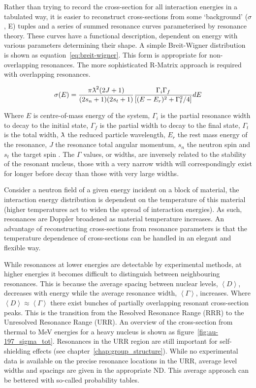 Rather than trying to record the cross-section for all interaction energies in a tabulated way, it is easier to reconstruct cross-sections from some `background' ($\sigma$, E) tuples and a series of summed resonance curves parameterised by resonance theory. These curves have a functional description, dependent on energy with various parameters determining their shape. A simple Breit-Wigner distribution is shown as equation~\ref{eq:breit-wigner}. This form is appropriate for non-overlapping resonances. The more sophisticated R-Matrix approach is required with overlapping resonances. 

\begin{equation}
  \sigma(E) =  \frac{\pi\lambdabar^{2}(2J + 1)}{(2s_{n} + 1)(2s_{t} + 1)}  \frac{\Gamma_{i}\Gamma_{f}}{[(E-E_{r})^{2} + \Gamma^{2}_{t}/4]} dE
  \label{eq:breit-wigner}
\end{equation}

Where $E$ is centre-of-mass energy of the system, $\Gamma_{i}$ is the partial resonance width to decay to the initial state, $\Gamma_{f}$ is the partial width to decay to the final state, $\Gamma_{t}$ is the total width, $\lambdabar$ the reduced particle wavelength, $E_{r}$ the rest mass energy of the resonance, $J$ the resonance total angular momentum, $s_{n}$ the neutron spin and $s_{t}$ the target spin \cite{Libby2005}. The $\Gamma$ values, or widths, are inversely related to the stability of the resonant nucleus, those with a very narrow width will correspondingly exist for longer before decay than those with very large widths.

Consider a neutron field of a given energy incident on a block of material, the interaction energy distribution is dependent on the temperature of this material (higher temperatures act to widen the spread of interaction energies). As such, resonances are Doppler broadened as material temperature increases. An advantage of reconstructing cross-sections from resonance parameters is that the temperature dependence of cross-sections can be handled in an elegant and flexible way. 

While resonances at lower energies are detectable by experimental methods, at higher energies it becomes difficult to distinguish between neighbouring resonances. This is because the average spacing between nuclear levels, $\left<D\right>$, decreases with energy while the average resonance width, $\left<\Gamma\right>$, increases. Where $\left<D\right> \approx \left<\Gamma\right>$ there exist bunches of partially overlapping resonant cross-section peaks. This is the transition from the Resolved Resonance Range (RRR) to the Unresolved Resonance Range (URR). An overview of the cross-section from thermal to MeV energies for a heavy nucleus is shown as figure~\ref{fig:au-197_sigma_tot}. Resonances in the URR region are still important for self-shielding effects (see chapter~\ref{chap:group_structure}). While no experimental data is available on the precise resonance locations in the URR, average level widths and spacings are given in the appropriate ND. This average approach can be bettered with so-called probability tables. 

